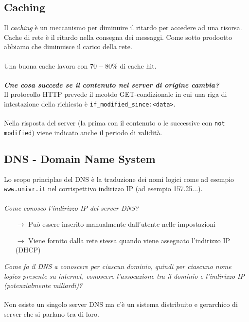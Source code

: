 \documentclass[a4paper]{article}
\begin{document}
\subsection{Caching}
Il \textit{caching} è un meccanismo per diminuire il ritardo per accedere ad una risorsa. Cache di rete è il ritardo nella consegna dei messaggi. Come sotto prodootto abbiamo che diminuisce il carico della rete.
\\\\
Una buona cache lavora con $70 - 80\%$ di cache hit.
\\\\
\textit{\textbf{Cne cosa succede se il contenuto nel server di origine cambia?}}
\\
Il protocollo HTTP prevede il meotdo GET-condizionale in cui una riga di intestazione della richiesta è \texttt{if\_modified\_since:<data>}.\\\\
Nella risposta del server (la prima con il contenuto o le successive con \texttt{not modified}) viene indicato anche il periodo di validità.

\subsection{DNS - Domain Name System}

Lo scopo principlae del DNS è la traduzione dei nomi logici come ad esempio \texttt{www.univr.it} nel corrispettivo indirizzo IP (ad esempio 157.25...).
\\\\
\textit{Come conosco l'indirizzo IP del server DNS?
}
\begin{itemize}
    \item[$\rightarrow$] Può essere inserito manualmente dall'utente nelle impostazioni
    \item[$\rightarrow$] Viene fornito dalla rete stessa quando viene assegnato l'indirizzo IP (DHCP)
\end{itemize}
\textit{Come fa  il DNS a conoscere per ciascun dominio, quindi per ciascuno nome logico presente su internet, conoscere l'assocazione tra il dominio e l'indirizzo IP (potenzialmente miliardi)?}\\\\
Non esiste un singolo server DNS ma c'è un sistema distribuito e gerarchico di server che si parlano tra di loro.
\end{document}
